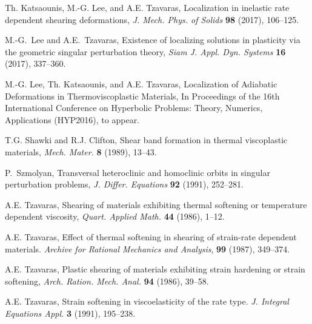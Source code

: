 \documentclass[a4paper,11pt]{article}
\theoremstyle{remark}
\begin{document}
\begin{thebibliography}{10}
{\sc Th. Katsaounis, M.-G. Lee, and A.E. Tzavaras},
Localization in inelastic rate dependent shearing deformations,
{\it J. Mech. Phys. of Solids} {\bf 98} (2017), 106--125.

{\sc M.-G.~Lee and A.E.~Tzavaras},
Existence of localizing solutions in plasticity via the geometric singular perturbation theory,
{\it Siam J. Appl. Dyn. Systems} {\bf 16} (2017), 337--360.

{\sc M.-G. Lee, Th. Katsaounis, and A.E. Tzavaras},
Localization of Adiabatic Deformations in Thermoviscoplastic Materials, In Proceedings of the 16th International Conference on Hyperbolic Problems: Theory, Numerics, Applications (HYP2016), to appear.

%
%
%

%
%

{\sc T.G. Shawki and R.J. Clifton},
Shear band formation in thermal viscoplastic materials,
{\it Mech. Mater.}
{\bf 8 } (1989), 13--43.

{\sc P.~Szmolyan},
Transversal heteroclinic and homoclinic orbits in singular perturbation problems,
{\it J. Differ. Equations}
{\bf 92} (1991), 252--281.

{\sc A.E. Tzavaras},
Shearing of materials exhibiting thermal softening or temperature dependent viscosity,
{\em Quart.  Applied Math.} {\bf 44} (1986), 1--12.

{\sc A.E. Tzavaras},
Effect of thermal softening in shearing of strain-rate dependent materials.
{\em Archive for Rational Mechanics and Analysis}, {\bf 99} (1987), 349--374.

{\sc A.E. Tzavaras},
Plastic shearing of materials exhibiting strain hardening or strain softening,
{\it Arch. Ration. Mech. Anal.}
{\bf 94} (1986), 39--58.

{\sc A.E. Tzavaras},
Strain softening in viscoelasticity of the rate type.
{\it J. Integral Equations Appl.} {\bf  3}  (1991), 195--238.


\end{thebibliography}
\end{document}
